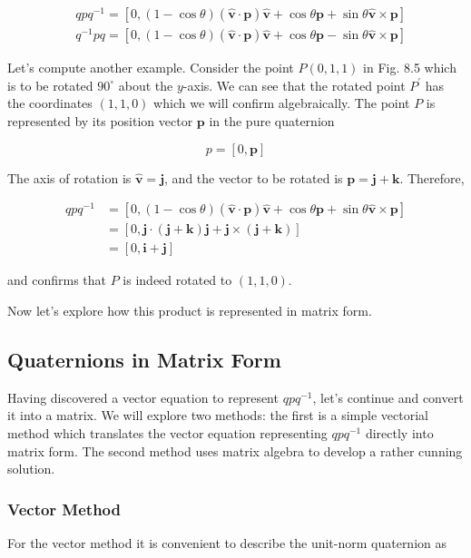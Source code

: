 \documentclass[10pt]{article}
\begin{document}
$$
\begin{aligned}
& q p q^{-1}=[0,(1-\cos \theta)(\hat{\mathbf{v}} \cdot \mathbf{p}) \hat{\mathbf{v}}+\cos \theta \mathbf{p}+\sin \theta \hat{\mathbf{v}} \times \mathbf{p}] \\
& q^{-1} p q=[0,(1-\cos \theta)(\hat{\mathbf{v}} \cdot \mathbf{p}) \hat{\mathbf{v}}+\cos \theta \mathbf{p}-\sin \theta \hat{\mathbf{v}} \times \mathbf{p}]
\end{aligned}
$$

Let's compute another example. Consider the point $P(0,1,1)$ in Fig. 8.5 which is to be rotated $90^{\circ}$ about the $y$-axis. We can see that the rotated point $P^{\prime}$ has the coordinates $(1,1,0)$ which we will confirm algebraically. The point $P$ is represented by its position vector $\mathbf{p}$ in the pure quaternion

$$
p=[0, \mathbf{p}]
$$

The axis of rotation is $\hat{\mathbf{v}}=\mathbf{j}$, and the vector to be rotated is $\mathbf{p}=\mathbf{j}+\mathbf{k}$. Therefore,

$$
\begin{aligned}
q p q^{-1} & =[0,(1-\cos \theta)(\hat{\mathbf{v}} \cdot \mathbf{p}) \hat{\mathbf{v}}+\cos \theta \mathbf{p}+\sin \theta \hat{\mathbf{v}} \times \mathbf{p}] \\
& =[0, \mathbf{j} \cdot(\mathbf{j}+\mathbf{k}) \mathbf{j}+\mathbf{j} \times(\mathbf{j}+\mathbf{k})] \\
& =[0, \mathbf{i}+\mathbf{j}]
\end{aligned}
$$

and confirms that $P$ is indeed rotated to $(1,1,0)$.

Now let's explore how this product is represented in matrix form.

\subsection{Quaternions in Matrix Form}
Having discovered a vector equation to represent $q p q^{-1}$, let's continue and convert it into a matrix. We will explore two methods: the first is a simple vectorial method which translates the vector equation representing $q p q^{-1}$ directly into matrix form. The second method uses matrix algebra to develop a rather cunning solution.

\subsubsection{Vector Method}
For the vector method it is convenient to describe the unit-norm quaternion as
\end{document}
